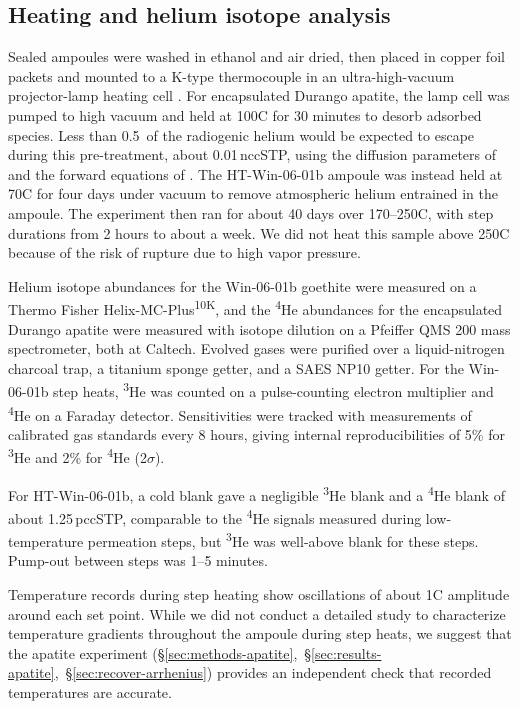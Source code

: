 \subsection{Heating and helium isotope analysis}\label{sec:methods-analysis}

Sealed ampoules were washed in ethanol and air dried, then placed in copper foil packets and mounted to a K-type thermocouple in an ultra-high-vacuum projector-lamp heating cell \citep{farley1999}. For encapsulated Durango apatite, the lamp cell was pumped to high vacuum and held at 100\textdegree C for 30 minutes to desorb adsorbed species. Less than 0.5\,\textperthousand{} of the radiogenic helium would be expected to escape during this pre-treatment, about 0.01\,nccSTP, using the diffusion parameters of \citet{farley2000} and the forward equations of \citet{fechtigkalbitzer1966}. The HT-Win-06-01b ampoule was instead held at 70\textdegree C for four days under vacuum to remove atmospheric helium entrained in the ampoule. The experiment then ran for about 40 days over 170--250\textdegree C, with step durations from 2 hours to about a week. We did not heat this sample above 250\textdegree C because of the risk of rupture due to high vapor pressure.

Helium isotope abundances for the Win-06-01b goethite were measured on a Thermo Fisher Helix-MC-Plus\textsuperscript{10K}, and the \textsuperscript{4}He abundances for the encapsulated Durango apatite were measured with isotope dilution on a Pfeiffer QMS 200 mass spectrometer, both at Caltech. Evolved gases were purified over a liquid-nitrogen charcoal trap, a titanium sponge getter, and a SAES NP10 getter. For the Win-06-01b step heats, \textsuperscript{3}He was counted on a pulse-counting electron multiplier and \textsuperscript{4}He on a Faraday detector. Sensitivities were tracked with measurements of calibrated gas standards every 8 hours, giving internal reproducibilities of 5\% for \textsuperscript{3}He and 2\% for \textsuperscript{4}He (2$\sigma$).

For HT-Win-06-01b, a cold blank gave a negligible \textsuperscript{3}He blank and a \textsuperscript{4}He blank of about 1.25\,pccSTP, comparable to the \textsuperscript{4}He signals measured during low-temperature permeation steps, but \textsuperscript{3}He was well-above blank for these steps. Pump-out between steps was 1--5 minutes. 

Temperature records during step heating show oscillations of about 1\textdegree C amplitude around each set point. While we did not conduct a detailed study to characterize temperature gradients throughout the ampoule during step heats, we suggest that the apatite experiment (\S\ref{sec:methods-apatite},~\S\ref{sec:results-apatite},~\S\ref{sec:recover-arrhenius}) provides an independent check that recorded temperatures are accurate. 

